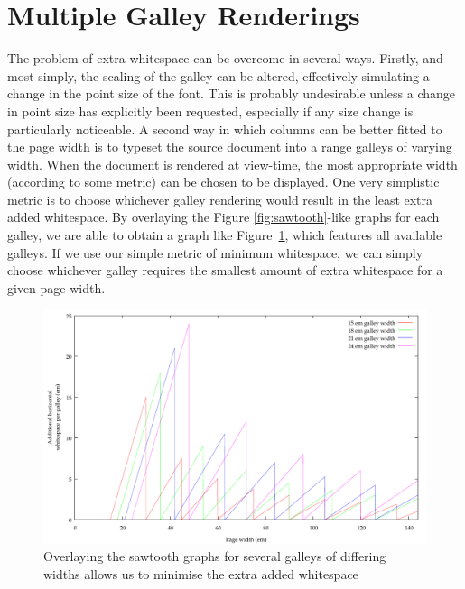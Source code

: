 \section{Multiple Galley Renderings}
The problem of extra whitespace can be overcome in several ways. Firstly, and most simply, the scaling of the galley can be altered, effectively simulating a change in the point size of the font. This is probably undesirable unless a change in point size has explicitly been requested, especially if any size change is particularly noticeable.
A second way in which columns can be better fitted to the page width is to typeset the source document into a range  galleys of varying width. When the document is rendered at view-time, the most appropriate width (according to some metric) can be chosen to be displayed. One very simplistic metric is to choose whichever galley rendering would result in the least extra added whitespace. By overlaying the Figure \ref{fig:sawtooth}-like graphs for each galley, we are able to obtain a graph like Figure~\ref{fig:overlay}, which features all available galleys. If we use our simple metric of minimum whitespace, we can simply choose whichever galley requires the smallest amount of extra whitespace for a given page width.

\begin{figure}
 \includegraphics[width=\textwidth]{gnuplot/overlay}
 \caption[Extra whitespace in a multiple galley document]{Overlaying the sawtooth graphs for several galleys of differing widths allows us to minimise the extra added whitespace}
 \label{fig:overlay}
\end{figure}


